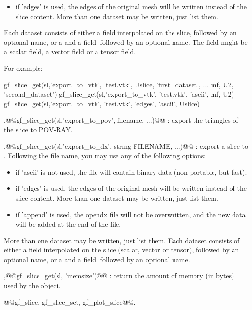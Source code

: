\begin{cmddescription}
\begin{itemize}
  \item if 'edges' is used, the edges of the original mesh will be written instead of the slice content.  More than one
    dataset may be written, just list them. 
  \end{itemize}
  Each dataset consists of either a field interpolated on the slice, followed by an optional name, or a
  \tmf and a field, followed by an optional name.  The field might be a
  scalar field, a vector field or a tensor field. 
  
  For example:
  \begin{mcode}
    gf_slice_get(sl,'export_to_vtk', 'test.vtk', Uslice, 'first_dataset', ...
              mf, U2, 'second_dataset')
    gf_slice_get(sl,'export_to_vtk', 'test.vtk', 'ascii', mf, U2)
    gf_slice_get(sl,'export_to_vtk', 'test.vtk', 'edges', 'ascii', Uslice)
  \end{mcode}

  \sep{@@gf_slice_get(sl,'export_to_pov', filename, ...)@@} :
  export the triangles of the slice to POV-RAY.

  \sep{@@gf_slice_get(sl,'export_to_dx', string FILENAME, ...)@@} :
  export a slice to \OpenDX.  Following the file name, you may use any of the
    following options:  \begin{itemize}
  \item if 'ascii' is not used, the file will contain binary
    data (non portable, but fast).
    
  \item if 'edges' is used, the edges of the original mesh will be written instead of the slice content.  More than one
    dataset may be written, just list them. 
  \item if 'append' is used, the opendx file will not be overwritten, and the new data will be
    added at the end of the file.
  \end{itemize}
  More than one dataset may be written, just list them. Each dataset
  consists of either a field interpolated on the slice (scalar,
  vector or tensor), followed by an optional name, or a \tmf and a
  field, followed by an optional name.
  
  \sep{@@gf_slice_get(sl, 'memsize')@@} : return the amount of memory (in bytes) used by the \tslc object.
\end{cmddescription}
\begin{gfseealso}
  @@gf_slice, gf_slice_set, gf_plot_slice@@.
\end{gfseealso}
\newpage

